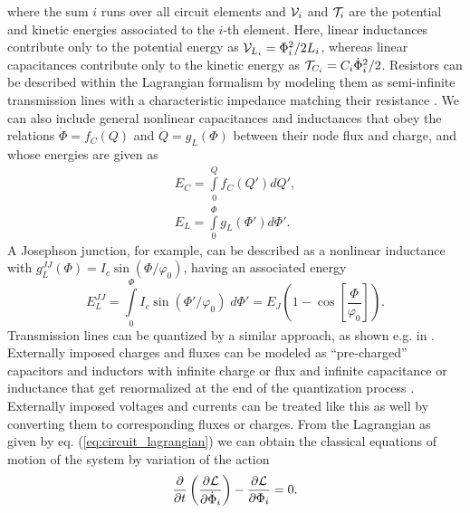 %
where the sum $i$ runs over all circuit elements and $\begin{mathcal}V\end{mathcal}_i$ and $\begin{mathcal}T\end{mathcal}_i$ are the potential and kinetic energies associated to the $i$-th element. Here, linear inductances contribute only to the potential energy as $\begin{mathcal}V\end{mathcal}_{L_i} = \Phi_i^2/2L_i$, whereas linear capacitances contribute only to the kinetic energy as $\begin{mathcal}T\end{mathcal}_{C_i}=C_i\dot{\Phi}_i^2/2$. Resistors can be described within the Lagrangian formalism by modeling them as semi-infinite transmission lines with a characteristic impedance matching their resistance \citep{yurke_quantum_1984}. We can also include general nonlinear capacitances and inductances that obey the relations $\dot{\Phi}=f_C(Q)$ and $\dot{Q}=g_L(\Phi)$ between their node flux and charge, and whose energies are given as
%
\begin{eqnarray}
E_C = \int\limits_0^Q f_C(Q')dQ', \\
E_L = \int\limits_0^\Phi g_L(\Phi')d\Phi'.
\end{eqnarray}
%
A Josephson junction, for example, can be described as a nonlinear inductance with $g_L^{JJ}(\Phi)=I_c\sin{(\Phi/\varphi_0)}$, having an associated energy
%
\begin{equation}
E_L^{JJ} = \int\limits_0^\Phi I_c\sin{\left(\Phi'/\varphi_0\right)} \; d\Phi'=E_J\left(1-\cos{\left[\frac{\Phi}{\varphi_0}\right]}\right).
\end{equation}
%
Transmission lines can be quantized by a similar approach, as shown e.g. in \citep{yurke_quantum_1984}. Externally imposed charges and fluxes can be modeled as ``pre-charged'' capacitors and inductors with infinite charge or flux and infinite capacitance or inductance that get renormalized at the end of the quantization process \citep{devoret_quantum_1995}. Externally imposed voltages and currents can be treated like this as well by converting them to corresponding fluxes or charges. From the Lagrangian as given by eq. (\ref{eq:circuit_lagrangian}) we can obtain the classical equations of motion of the system by variation of the action
%
\begin{equation}
\frac{\partial}{\partial t}\left( \frac{\partial \begin{mathcal}L\end{mathcal}}{\partial\dot{\Phi}_i}\right)-\frac{\partial \begin{mathcal}L\end{mathcal}}{\partial \Phi_i} = 0.
\end{equation}
